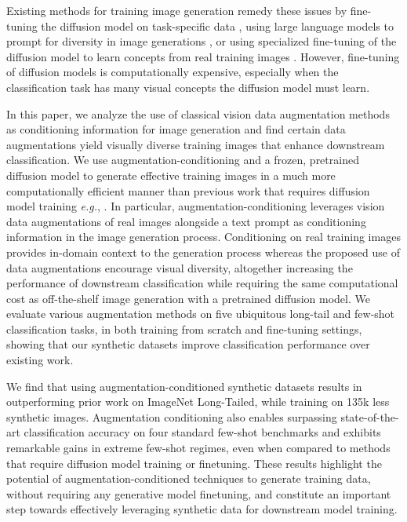 Existing methods for training image generation remedy these issues by fine-tuning the diffusion model on task-specific data \cite{syntheticdataimagenet}, using large language models to prompt for diversity in image generations \cite{diversify}, or using specialized fine-tuning of the diffusion model to learn concepts from real training images \citep{fill-up-lt, da-fusion}. 
However, fine-tuning of diffusion models is computationally expensive, especially when the classification task has many visual concepts the diffusion model must learn.

In this paper, we analyze the use of classical vision data augmentation methods as conditioning information for image generation and find certain data augmentations yield visually diverse training images that enhance downstream classification.
We use augmentation-conditioning and a frozen, pretrained diffusion model to generate effective training images in a much more computationally efficient manner than previous work that requires diffusion model training \textit{e.g.}, \citep{syntheticdataimagenet, da-fusion, fill-up-lt}.
In particular, augmentation-conditioning leverages vision data augmentations of real images alongside a text prompt as conditioning information in the image generation process.
Conditioning on real training images provides in-domain context to the generation process whereas the proposed use of data augmentations encourage visual diversity, altogether increasing the performance of downstream classification while requiring the same computational cost as off-the-shelf image generation with a pretrained diffusion model. 
We evaluate various augmentation methods on five ubiquitous long-tail and few-shot classification tasks, in both training from scratch and fine-tuning settings, showing that our synthetic datasets improve classification performance over existing work. 

We find that using augmentation-conditioned synthetic datasets results in outperforming prior work on ImageNet Long-Tailed, while training on 135k less synthetic images. 
Augmentation conditioning also enables surpassing state-of-the-art classification accuracy on four standard few-shot benchmarks and exhibits remarkable gains in extreme few-shot regimes, even when compared to methods that require diffusion model training or finetuning. 
These results highlight the potential of augmentation-conditioned techniques to generate training data, without requiring any generative model finetuning, and constitute an important step towards effectively leveraging synthetic data for downstream model training. 
\vspace{-0.1cm}

